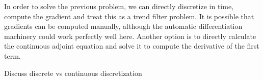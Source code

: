 In order to solve the previous problem, we can directly discretize in time, compute the gradient and treat this as a trend filter problem. 
It is possible that gradients can be computed manually, although the automatic differentiation machinery could work perfectly well here.
Another option is to directly calculate the continuous adjoint equation and solve it to compute the derivative of the first term. 

Discuss discrete vs continuous discretization 
